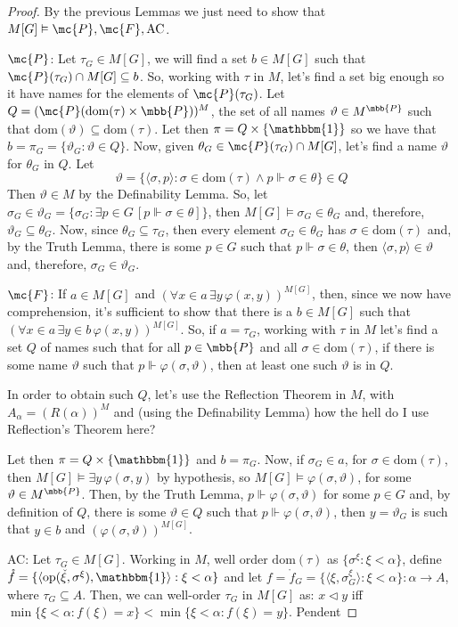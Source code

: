\begin{proof}
    By the previous Lemmas we just need to show that $M[G]\vDash\mc{P},\mc{F},\text{AC}$.

    $\mc{P}$: Let $\tau_G\in M[G]$, we will find a set $b\in M[G]$ such that $\mc{P}(\tau_G)\cap M[G]\subseteq b$. So, working with $\tau$ in $M$, let's find a set big enough so it have names for the elements of $\mc{P}(\tau_G)$. Let $Q=(\mc{P}(\text{dom}(\tau)\times\mbb{P}))^M$, the set of all names $\vartheta\in M^{\mbb{P}}$ such that $\text{dom}(\vartheta)\subseteq\text{dom}(\tau)$. Let then $\pi=Q\times\{\mathbbm{1}\}$ so we have that $b=\pi_G=\{\vartheta_G:\vartheta\in Q\}$. Now, given $\theta_G\in\mc{P}(\tau_G)\cap M[G]$, let's find a name $\vartheta$ for $\theta_G$ in $Q$. Let
    $$\vartheta=\{\langle\sigma,p\rangle:\sigma\in\text{dom}(\tau)\wedge p\Vdash\sigma\in\theta\}\in Q$$
    Then $\vartheta\in M$ by the Definability Lemma. So, let $\sigma_G\in\vartheta_G=\{\sigma_G:\exists p\in G\,[p\Vdash\sigma\in\theta]\}$, then $M[G]\vDash\sigma_G\in\theta_G$ and, therefore, $\vartheta_G\subseteq\theta_G$. Now, since $\theta_G\subseteq\tau_G$, then every element $\sigma_G\in\theta_G$ has $\sigma\in\text{dom}(\tau)$ and, by the Truth Lemma, there is some $p\in G$ such that $p\Vdash\sigma\in\theta$, then $\langle\sigma,p\rangle\in\vartheta$ and, therefore, $\sigma_G\in\vartheta_G$.

    $\mc{F}$: If $a\in M[G]$ and $(\forall x\in a\,\exists y\,\varphi(x,y))^{M[G]}$, then, since we now have comprehension, it's sufficient to show that there is a $b\in M[G]$ such that $(\forall x\in a\,\exists y\in b\,\varphi(x,y))^{M[G]}$. So, if $a=\tau_G$, working with $\tau$ in $M$ let's find a set $Q$ of names such that for all $p\in\mbb{P}$ and all $\sigma\in\text{dom}(\tau)$, if there is some name $\vartheta$ such that $p\Vdash\varphi(\sigma,\vartheta)$, then at least one such $\vartheta$ is in $Q$.
    
    In order to obtain such $Q$, let's use the Reflection Theorem in $M$, with $A_\alpha=(R(\alpha))^M$ and (using the Definability Lemma) \textcolor{laser_eyes}{how the hell do I use Reflection's Theorem here?}

    Let then $\pi=Q\times\{\mathbbm{1}\}$ and $b=\pi_G$. Now, if $\sigma_G\in a$, for $\sigma\in\text{dom}(\tau)$, then $M[G]\vDash\exists y\,\varphi(\sigma,y)$ by hypothesis, so $M[G]\vDash\varphi(\sigma,\vartheta)$, for some $\vartheta\in M^{\mbb{P}}$. Then, by the Truth Lemma, $p\Vdash\varphi(\sigma,\vartheta)$ for some $p\in G$ and, by definition of $Q$, there is some $\vartheta\in Q$ such that $p\Vdash\varphi(\sigma,\vartheta)$, then $y=\vartheta_G$ is such that $y\in b$ and $(\varphi(\sigma,\vartheta))^{M[G]}$.

    AC: Let $\tau_G\in M[G]$. Working in $M$, well order $\text{dom}(\tau)$ as $\{\sigma^\xi:\xi<\alpha\}$, define $\mathring{f}=\{\langle\text{op}(\check{\xi},\sigma^\xi),\mathbbm{1}\rangle:\xi<\alpha\}$ and let $f=\mathring{f}_G=\{\langle\xi,\sigma_G^\xi\rangle:\xi<\alpha\}:\alpha\to A$, where $\tau_G\subseteq A$. Then, we can well-order $\tau_G$ in $M[G]$ as: $x\lhd y$ iff $\min\{\xi<\alpha:f(\xi)=x\}<\min\{\xi<\alpha:f(\xi)=y\}$. \textcolor{laser_eyes}{Pendent}
\end{proof}

